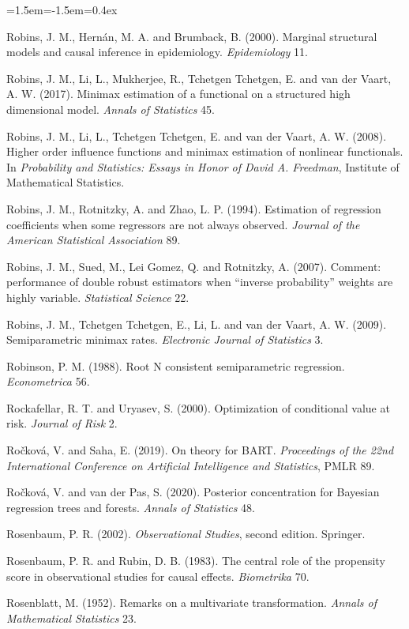 \begin{list}{}{\leftmargin=1.5em\itemindent=-1.5em\itemsep=0.4ex}
\item Robins, J. M., Hern\'an, M. A. and Brumback, B. (2000). Marginal structural models and causal inference in epidemiology. \emph{Epidemiology} 11.
\item Robins, J. M., Li, L., Mukherjee, R., Tchetgen Tchetgen, E. and van der Vaart, A. W. (2017). Minimax estimation of a functional on a structured high dimensional model. \emph{Annals of Statistics} 45.
\item Robins, J. M., Li, L., Tchetgen Tchetgen, E. and van der Vaart, A. W. (2008). Higher order influence functions and minimax estimation of nonlinear functionals. In \emph{Probability and Statistics: Essays in Honor of David A. Freedman}, Institute of Mathematical Statistics.
\item Robins, J. M., Rotnitzky, A. and Zhao, L. P. (1994). Estimation of regression coefficients when some regressors are not always observed. \emph{Journal of the American Statistical Association} 89.
\item Robins, J. M., Sued, M., Lei Gomez, Q. and Rotnitzky, A. (2007). Comment: performance of double robust estimators when ``inverse probability'' weights are highly variable. \emph{Statistical Science} 22.
\item Robins, J. M., Tchetgen Tchetgen, E., Li, L. and van der Vaart, A. W. (2009). Semiparametric minimax rates. \emph{Electronic Journal of Statistics} 3.
\item Robinson, P. M. (1988). Root N consistent semiparametric regression. \emph{Econometrica} 56.
\item Rockafellar, R. T. and Uryasev, S. (2000). Optimization of conditional value at risk. \emph{Journal of Risk} 2.
\item Ro\v{c}kov\'a, V. and Saha, E. (2019). On theory for BART. \emph{Proceedings of the 22nd International Conference on Artificial Intelligence and Statistics}, PMLR 89.
\item Ro\v{c}kov\'a, V. and van der Pas, S. (2020). Posterior concentration for Bayesian regression trees and forests. \emph{Annals of Statistics} 48.
\item Rosenbaum, P. R. (2002). \emph{Observational Studies}, second edition. Springer.
\item Rosenbaum, P. R. and Rubin, D. B. (1983). The central role of the propensity score in observational studies for causal effects. \emph{Biometrika} 70.
\item Rosenblatt, M. (1952). Remarks on a multivariate transformation. \emph{Annals of Mathematical Statistics} 23.

\end{list}

